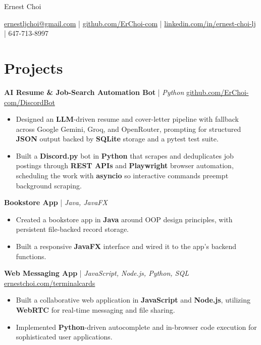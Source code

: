 \documentclass[11pt]{article}
\begin{document}
\centerline{\Huge Ernest Choi}
\vspace{3pt}

\centerline{%
  \href{mailto:ernestljchoi@gmail.com}{ernestljchoi@gmail.com} |
  \href{https://www.github.com/ErChoi-com}{github.com/ErChoi-com} |
  \href{https://www.linkedin.com/in/ernest-choi-lj}{linkedin.com/in/ernest-choi-lj} |
  647-713-8997
}


\section*{Projects}

\textbf{AI Resume \& Job-Search Automation Bot} | \textit{Python} \hfill \href{https://github.com/ErChoi-com/DiscordBot}{github.com/ErChoi-com/DiscordBot} \\
\begin{itemize}
  \item Designed an \textbf{LLM}-driven resume and cover-letter pipeline with fallback across Google Gemini, Groq, and OpenRouter, prompting for structured \textbf{JSON} output backed by \textbf{SQLite} storage and a pytest test suite.
  \item Built a \textbf{Discord.py} bot in \textbf{Python} that scrapes and deduplicates job postings through \textbf{REST APIs} and \textbf{Playwright} browser automation, scheduling the work with \textbf{asyncio} so interactive commands preempt background scraping.
\end{itemize}

\textbf{Bookstore App} | \textit{Java, JavaFX} \\
\begin{itemize}
  \item Created a bookstore app in \textbf{Java} around OOP design principles, with persistent file-backed record storage.
  \item Built a responsive \textbf{JavaFX} interface and wired it to the app's backend functions.
\end{itemize}

\textbf{Web Messaging App} | \textit{JavaScript, Node.js, Python, SQL} \hfill \href{https://www.ernestchoi.com/terminalcards/roomEnter.html}{ernestchoi.com/terminalcards} \\
\begin{itemize}
  \item Built a collaborative web application in \textbf{JavaScript} and \textbf{Node.js}, utilizing \textbf{WebRTC} for real-time messaging and file sharing.
  \item Implemented \textbf{Python}-driven autocomplete and in-browser code execution for sophisticated user applications.
\end{itemize}
\end{document}
